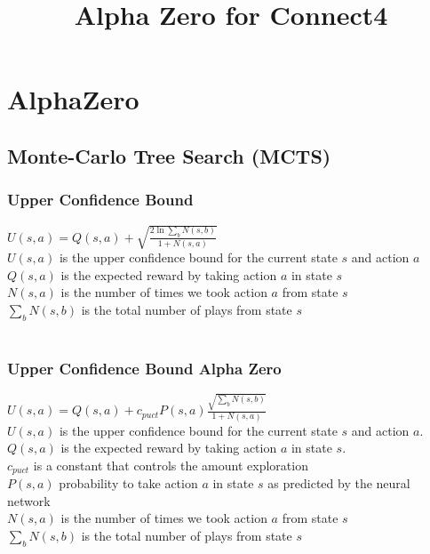 \documentclass{article}
\title{Alpha Zero for Connect4}
\begin{document}
\maketitle


\section{AlphaZero}
\subsection{Monte-Carlo Tree Search (MCTS)}
\subsubsection{Upper Confidence Bound}
$ U(s,a) = Q(s,a) + \sqrt{\frac{2\ln{\sum\nolimits_{b}N(s,b)}}{1 + N(s,a)}}$ \\

\noindent
$U(s,a)$ is the upper confidence bound for the current state $s$ and action $a$ \\
$Q(s,a)$ is the expected reward by taking action $a$ in state $s$ \\
$N(s,a)$ is the number of times we took action $a$ from state $s$ \\
$\sum\nolimits_{b}N(s,b)$ is the total number of plays from state $s$ \\
\\


\subsubsection{Upper Confidence Bound Alpha Zero}
\noindent 
$ U(s,a) = Q(s,a) + c_{puct} P(s,a) \frac{\sqrt{\sum\nolimits_{b}N(s,b)}}{1 + N(s,a)}$ \\

\noindent 
$U(s,a)$ is the upper confidence bound for the current state $s$ and action $a$. \\
$Q(s,a)$ is the expected reward by taking action $a$ in state $s$. \\
$c_{puct}$ is a constant that controls the amount exploration \\ 
$P(s,a)$ probability to take action $a$ in state $s$ as predicted by the neural network \\
$N(s,a)$ is the number of times we took action $a$ from state $s$ \\
$\sum\nolimits_{b}N(s,b)$ is the total number of plays from state $s$ \\
\\
\end{document}
